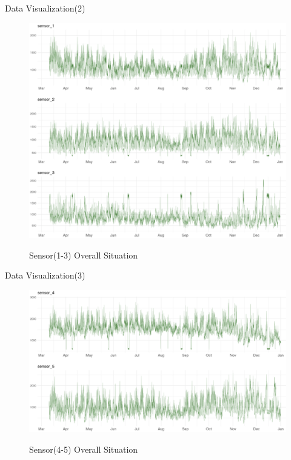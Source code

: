 \documentclass[
 size=14pt,
 paper=smartboard,  %
 mode=present, 		%
 display=slides, 	%
 style=tuliplab,  	%
 pauseslide,
 fleqn,leqno]{powerdot}
\begin{document}
\begin{slide}[toc=,bm=]{Data Visualization(2)}
	
	\begin{figure}
		\centering
        \includegraphics[scale=0.3]{figures//p2.eps}\\
		\caption{Sensor(1-3) Overall Situation}\label{fig:Sensor(1-3) Overall Situation}
	\end{figure}
	
\end{slide}

\begin{slide}[toc=,bm=]{Data Visualization(3)}
	
	\begin{figure}
		\centering
        \includegraphics[scale=0.35]{figures//p3.eps}\\
		\caption{Sensor(4-5) Overall Situation}\label{fig:Sensor(4-5) Overall Situation}
	\end{figure}
	
\end{slide}
\end{document}
